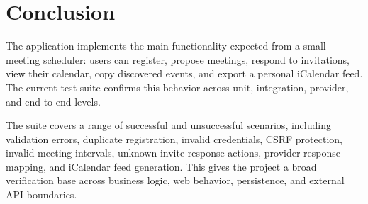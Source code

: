 \chapter{Conclusion} \label{cap:conclusion}

The application implements the main functionality expected from a small meeting scheduler: users can register, propose meetings, respond to invitations, view their calendar, copy discovered events, and export a personal iCalendar feed. The current test suite confirms this behavior across unit, integration, provider, and end-to-end levels.

The suite covers a range of successful and unsuccessful scenarios, including validation errors, duplicate registration, invalid credentials, CSRF protection, invalid meeting intervals, unknown invite response actions, provider response mapping, and iCalendar feed generation. This gives the project a broad verification base across business logic, web behavior, persistence, and external API boundaries.